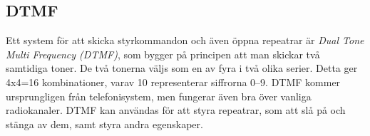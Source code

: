 \subsection{DTMF}

Ett system för att skicka styrkommandon och även öppna repeatrar är
\emph{Dual Tone Multi Frequency (DTMF)}, som bygger på principen att man
skickar två samtidiga toner.
De två tonerna väljs som en av fyra i två olika serier.
Detta ger 4x4=16 kombinationer, varav 10 representerar siffrorna 0--9.
DTMF kommer ursprungligen från telefonisystem, men fungerar även bra över
vanliga radiokanaler.
DTMF kan användas för att styra repeatrar, som att slå på och stänga av dem,
samt styra andra egenskaper.
